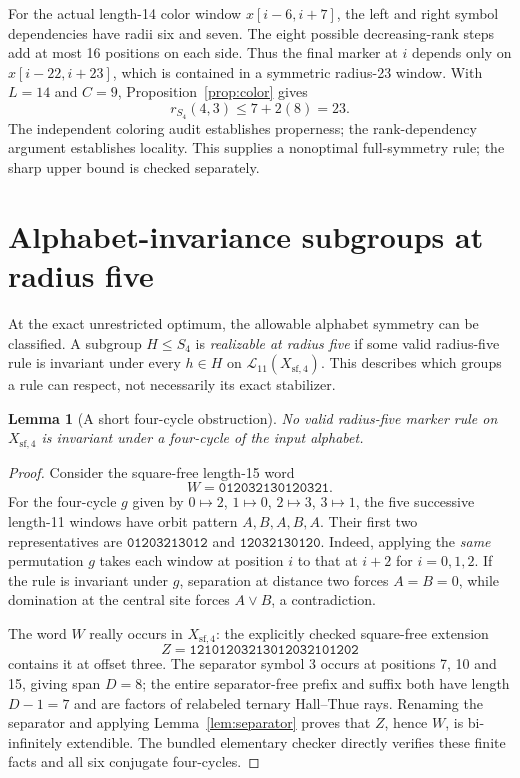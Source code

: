 \documentclass[11pt]{article}
\newtheorem{lemma}[theorem]{Lemma}
\theoremstyle{remark}
\newcommand{\Xsf}{X_{\mathrm{sf},4}}
\newcommand{\Lang}{\mathcal{L}}
\newcommand{\Sym}{S_4}
\begin{document}
For the actual length-14 color window $x[i-6,i+7]$,
the left and right symbol dependencies have radii six and
seven. The eight possible decreasing-rank steps add at most
16 positions on each side. Thus the final marker at $i$
depends only on $x[i-22,i+23]$, which is contained in
a symmetric radius-23 window. With $L=14$ and $C=9$,
Proposition~\ref{prop:color} gives
\[
            r_{\Sym}(4,3)\le7+2(8)=23.
\]
The independent coloring audit establishes properness;
the rank-dependency argument establishes locality.
This supplies a nonoptimal full-symmetry rule;
the sharp upper bound is checked separately.

\section{Alphabet-invariance subgroups at radius five}
\label{sec:subgroup}

At the exact unrestricted optimum, the allowable alphabet
symmetry can be classified. A subgroup $H\le S_4$ is
\emph{realizable at radius five} if some valid radius-five
rule is invariant under every $h\in H$ on
$\Lang_{11}(\Xsf)$. This describes which groups a rule
can respect, not necessarily its exact stabilizer.

\begin{lemma}[A short four-cycle obstruction]
\label{lem:fourcycle}
No valid radius-five marker rule on $\Xsf$ is invariant
under a four-cycle of the input alphabet.
\end{lemma}
\begin{proof}
Consider the square-free length-15 word
\[
 W=\texttt{012032130120321}.
\]
For the four-cycle $g$ given by
$0\mapsto2$, $1\mapsto0$, $2\mapsto3$, $3\mapsto1$,
the five successive length-11 windows have orbit
pattern $A,B,A,B,A$. Their first two representatives are
$\texttt{01203213012}$ and $\texttt{12032130120}$.
Indeed, applying the \emph{same} permutation $g$ takes
each window at position $i$ to that at $i+2$ for
$i=0,1,2$.
If the rule is invariant under $g$, separation at
distance two forces $A=B=0$, while domination at the
central site forces $A\vee B$, a contradiction.

The word $W$ really occurs in $\Xsf$: the explicitly
checked square-free extension
\[
 Z=\texttt{12101203213012032101202}
\]
contains it at offset three. The separator symbol $3$
occurs at positions 7, 10 and 15, giving span $D=8$;
the entire separator-free prefix and suffix both
have length $D-1=7$ and are factors of relabeled
ternary Hall--Thue rays. Renaming the separator and
applying Lemma~\ref{lem:separator} proves that
$Z$, hence $W$, is bi-infinitely extendible.
The bundled elementary checker directly verifies
these finite facts and all six conjugate four-cycles.
\end{proof}
\end{document}
